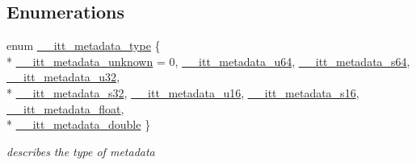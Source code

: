 \subsection*{Enumerations}
\begin{DoxyCompactItemize}
\item 
enum \hyperlink{group__metadata_ga906320efadd24c37fc2ee021e880a673}{\-\_\-\-\_\-itt\-\_\-metadata\-\_\-type} \{ \\*
\hyperlink{group__metadata_gga906320efadd24c37fc2ee021e880a673abfcc238b9fc176510a01b11f5b592904}{\-\_\-\-\_\-itt\-\_\-metadata\-\_\-unknown} = 0, 
\hyperlink{group__metadata_gga906320efadd24c37fc2ee021e880a673a33754465ee8a15fc38270050a8f1eb03}{\-\_\-\-\_\-itt\-\_\-metadata\-\_\-u64}, 
\hyperlink{group__metadata_gga906320efadd24c37fc2ee021e880a673a2ea9b3d3305f3c79899bf2a6cc28c387}{\-\_\-\-\_\-itt\-\_\-metadata\-\_\-s64}, 
\hyperlink{group__metadata_gga906320efadd24c37fc2ee021e880a673aeb76f9ad9507657f720070824421d440}{\-\_\-\-\_\-itt\-\_\-metadata\-\_\-u32}, 
\\*
\hyperlink{group__metadata_gga906320efadd24c37fc2ee021e880a673a9d216a6e79c71de0fd411517a91a68c8}{\-\_\-\-\_\-itt\-\_\-metadata\-\_\-s32}, 
\hyperlink{group__metadata_gga906320efadd24c37fc2ee021e880a673a87743b7100995bca6b0677d05be50c62}{\-\_\-\-\_\-itt\-\_\-metadata\-\_\-u16}, 
\hyperlink{group__metadata_gga906320efadd24c37fc2ee021e880a673a3b3b5d18018461f2c27775dcf1421573}{\-\_\-\-\_\-itt\-\_\-metadata\-\_\-s16}, 
\hyperlink{group__metadata_gga906320efadd24c37fc2ee021e880a673a115d51bb4ac36b09afd93959c2758ff5}{\-\_\-\-\_\-itt\-\_\-metadata\-\_\-float}, 
\\*
\hyperlink{group__metadata_gga906320efadd24c37fc2ee021e880a673a01778ca21a498d0835db181289c605a3}{\-\_\-\-\_\-itt\-\_\-metadata\-\_\-double}
 \}
\begin{DoxyCompactList}\small\item\em describes the type of metadata \end{DoxyCompactList}\end{DoxyCompactItemize}
